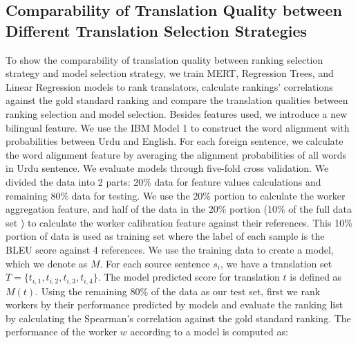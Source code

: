 \documentclass[11pt]{article}
\begin{document}
\subsection{Comparability of Translation Quality between Different Translation Selection Strategies}
To show the comparability of translation quality between ranking selection strategy and model selection strategy, we train MERT, Regression Trees, and Linear Regression models to rank translators, calculate rankings' correlations against the gold standard ranking and compare the translation qualities between ranking selection and model selection. Besides features \cite{Zaidan09zmert} used, we introduce a new bilingual feature. We use the IBM Model 1 to construct the word alignment with probabilities between Urdu and English. For each foreign sentence, we calculate the word alignment feature by averaging the alignment probabilities of all words in Urdu sentence. 
 We evaluate models through five-fold cross validation. We divided the data into 2 parts: 20\% data for feature values calculations and remaining 80\% data for testing. We use the  20\% portion to calculate the worker aggregation feature, and half of the data in the 20\% portion (10\% of the full data set ) to calculate the worker calibration feature against their references.  This 10\% portion of data is used as training set where the label of each sample is the BLEU score against 4 references. %
We use the training data to create a model, which we denote as $M$. For each source sentence $s_i$, we have a translation set $T = \{ t_{i,1}, t_{i,2},t_{i,3}, t_{i,4}\}$. %
The model predicted score for translation $t$ is defined as $M(t)$.
%  
Using the remaining 80\% of the data as our test set, first we rank workers by their performance predicted by models and evaluate the ranking list by calculating the Spearman's correlation against the gold standard ranking. The performance of the worker $w$ according to a model is computed as:
\end{document}
